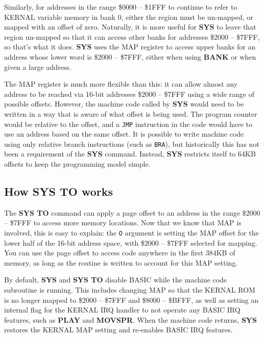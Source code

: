 Similarly, for addresses in the range \$0000 -- \$1FFF to continue to refer to KERNAL variable memory in bank 0, either the region must be un-mapped, or mapped with an offset of zero. Naturally, it is more useful for {\bf SYS} to leave that region un-mapped so that it can access other banks for addresses \$2000 -- \$7FFF, so that's what it does. {\bf SYS} uses the MAP register to access upper banks for an address whose lower word is \$2000 -- \$7FFF, either when using {\bf BANK} or when given a large address.

The MAP register is much more flexible than this: it can allow almost any address to be reached via 16-bit addresses \$2000 -- \$7FFF using a wide range of possible offsets. However, the machine code called by {\bf SYS} would need to be written in a way that is aware of what offset is being used. The program counter would be relative to the offset, and a {\tt JMP} instruction in the code would have to use an address based on the same offset. It is possible to write machine code using only relative branch instructions (such as {\tt BRA}), but historically this has not been a requirement of the {\bf SYS} command. Instead, {\bf SYS} restricts itself to 64KB offsets to keep the programming model simple.

\subsection{How SYS TO works}

The {\bf SYS TO} command can apply a page offset to an address in the range \$2000 -- \$7FFF to access more memory locations. Now that we know that MAP is involved, this is easy to explain: the \texttt{O} argument is setting the MAP offset for the lower half of the 16-bit address space, with \$2000 -- \$7FFF selected for mapping. You can use the page offset to access code anywhere in the first 384KB of memory, as long as the routine is written to account for this MAP setting.


By default, {\bf SYS} and {\bf SYS TO} disable BASIC while the machine code subroutine is running. This includes changing MAP so that the KERNAL ROM is no longer mapped to \$2000 -- \$7FFF and \$8000 -- \$BFFF, as well as setting an internal flag for the KERNAL IRQ handler to not operate any BASIC IRQ features, such as {\bf PLAY} and {\bf MOVSPR}. When the machine code returns, {\bf SYS} restores the KERNAL MAP setting and re-enables BASIC IRQ features.

